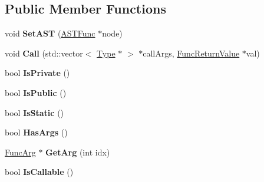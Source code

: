 \subsection*{Public Member Functions}
\begin{DoxyCompactItemize}
\item 
\hypertarget{class_cobra_1_1internal_1_1_func_a8ca0e1c0080cbb78b02d28c15d85eab4}{void {\bfseries Set\+A\+S\+T} (\hyperlink{class_cobra_1_1internal_1_1_a_s_t_func}{A\+S\+T\+Func} $\ast$node)}\label{class_cobra_1_1internal_1_1_func_a8ca0e1c0080cbb78b02d28c15d85eab4}

\item 
\hypertarget{class_cobra_1_1internal_1_1_func_ab4239115a6439279222f6165b8cea670}{void {\bfseries Call} (std\+::vector$<$ \hyperlink{class_cobra_1_1internal_1_1_type}{Type} $\ast$ $>$ $\ast$call\+Args, \hyperlink{class_cobra_1_1internal_1_1_func_return_value}{Func\+Return\+Value} $\ast$val)}\label{class_cobra_1_1internal_1_1_func_ab4239115a6439279222f6165b8cea670}

\item 
\hypertarget{class_cobra_1_1internal_1_1_func_aaee32624642939fab1a59a1a597c0f82}{bool {\bfseries Is\+Private} ()}\label{class_cobra_1_1internal_1_1_func_aaee32624642939fab1a59a1a597c0f82}

\item 
\hypertarget{class_cobra_1_1internal_1_1_func_a4c4a023a2a8ea2d8cd1ce61ce1542798}{bool {\bfseries Is\+Public} ()}\label{class_cobra_1_1internal_1_1_func_a4c4a023a2a8ea2d8cd1ce61ce1542798}

\item 
\hypertarget{class_cobra_1_1internal_1_1_func_ae776f7781456ba3446bea19b11809f7f}{bool {\bfseries Is\+Static} ()}\label{class_cobra_1_1internal_1_1_func_ae776f7781456ba3446bea19b11809f7f}

\item 
\hypertarget{class_cobra_1_1internal_1_1_func_a6cd63cd9caa681ad37330458c6c965e2}{bool {\bfseries Has\+Args} ()}\label{class_cobra_1_1internal_1_1_func_a6cd63cd9caa681ad37330458c6c965e2}

\item 
\hypertarget{class_cobra_1_1internal_1_1_func_afba31648569942e907d5333ff438f234}{\hyperlink{class_cobra_1_1internal_1_1_func_arg}{Func\+Arg} $\ast$ {\bfseries Get\+Arg} (int idx)}\label{class_cobra_1_1internal_1_1_func_afba31648569942e907d5333ff438f234}

\item 
\hypertarget{class_cobra_1_1internal_1_1_func_a0ab75aebbf16f3f7f230ce9cc6705902}{bool {\bfseries Is\+Callable} ()}\label{class_cobra_1_1internal_1_1_func_a0ab75aebbf16f3f7f230ce9cc6705902}


\end{DoxyCompactItemize}
